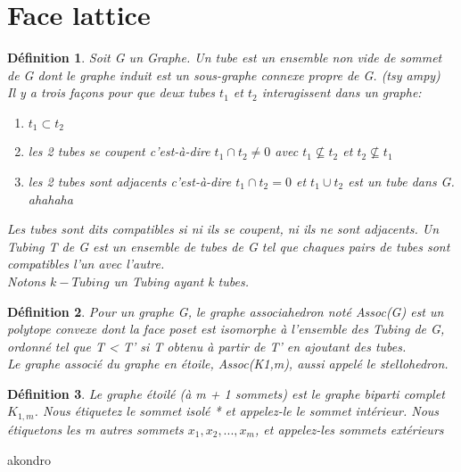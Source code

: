 \documentclass{book}
\newtheorem{petit_nom2}{Définition}[chapter]
\begin{document}
\section{Face lattice}
\begin{petit_nom2}
Soit G un Graphe. Un \textit{tube} est un ensemble non vide de sommet de G dont le graphe induit est un sous-graphe connexe propre de G. (tsy ampy)\\
Il y a trois façons pour que deux tubes $t_1$ et $t_2$ interagissent dans un graphe:
\begin{enumerate}
\item $t_1 \subset t_2$
\item les 2 tubes se coupent c'est-à-dire $t_1 \cap t_2 \neq 0$ avec $ t_1 \nsubseteq t_2$ et $t_2 \nsubseteq t_1 $
\item les 2 tubes sont adjacents c'est-à-dire $t_1 \cap t_2 = 0$ et $t_1 \cup t_2$ est un tube dans G. ahahaha
\end{enumerate}
Les tubes sont dits compatibles si ni ils se coupent, ni ils ne sont adjacents. Un Tubing T de G est un ensemble 
de tubes de G tel que chaques pairs de tubes sont compatibles  l'un avec l'autre.\\
Notons $k-Tubing$ un Tubing ayant k tubes.\\
\end{petit_nom2}

\begin{petit_nom2}
  Pour un graphe G, le graphe associahedron noté \textit{Assoc(G)} est un polytope convexe dont la face poset est isomorphe à l'ensemble des Tubing de G, ordonné tel que T < T'
  si T obtenu à partir de T' en ajoutant des tubes.\\
  Le graphe associé du graphe en étoile, Assoc(K1,m), aussi appelé le \textit{stellohedron}.\\
\end{petit_nom2}

\begin{petit_nom2}
  Le graphe étoilé (à m + 1 sommets) est le graphe biparti complet $K_{1,m}$. Nous
étiquetez le sommet isolé * et appelez-le le sommet intérieur. Nous étiquetons les m autres sommets $x_1, x_2, . . . , x_m$,
et appelez-les sommets extérieurs
\end{petit_nom2}

akondro
\end{document}
